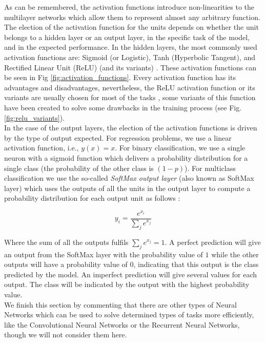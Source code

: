 As can be remembered, the activation functions introduce non-linearities to the multilayer networks which allow them to represent almost any arbitrary function. The election of the activation function for the units depends on whether the unit belongs to a hidden layer or an output layer, in the specific task of the model, and in the expected performance. In the hidden layers, the most commonly used activation functions are: Sigmoid (or Logistic), Tanh (Hyperbolic Tangent), and Rectified Linear Unit (ReLU) (and its variants) \cite{deep_learning}. These activation functions can be seen in Fig \ref{fig:activation_functions}. Every activation function has its advantages and disadvantages, nevertheless, the ReLU activation function or its variants are usually chosen for most of the tasks \cite{fudamentals_deep_learning}, some variants of this function have been created to solve some drawbacks in the training process (see Fig. \ref{fig:relu_variants}).\\

In the case of the output layers, the election of the activation functions is driven by the type of output expected. For regression problems, we use a linear activation function, i.e., $y(x)=x$. For binary classification, we use a single neuron with a sigmoid function which delivers a probability distribution for a single class (the probability of the other class is $(1-p)$). For multiclass classification we use the so-called \textit{SoftMax output layer} (also known as SoftMax layer) which uses the outputs of all the units in the output layer to compute a probability distribution for each output unit as follows \cite{fudamentals_deep_learning}:

\begin{equation}
y_{i}=\frac{e^{x_{i}}}{\sum_{j} e^{x_{j}}}
\end{equation}

Where the sum of all the outputs fulfils $\sum_{j} e^{x_{j}}=1$. A perfect prediction will give an output from the SoftMax layer with the probability value of $1$ while the other outputs will have a probability value of $0$, indicating that this output is the class predicted by the model. An imperfect prediction will give several values for each output. The class will be indicated by the output with the highest probability value.\\

We finish this section by commenting that there are other types of Neural Networks which can be used to solve determined types of tasks more efficiently, like the Convolutional Neural Networks or the Recurrent Neural Networks, though we will not consider them here.


